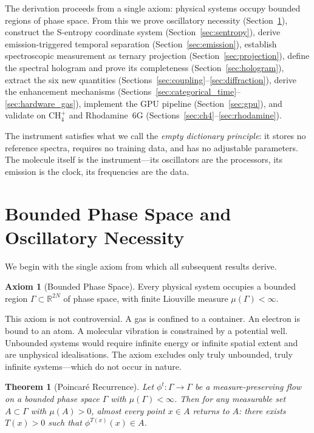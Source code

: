 \documentclass[11pt,twocolumn,a4paper]{article}
\newtheorem{theorem}{Theorem}[section]
\theoremstyle{definition}
\newtheorem{axiom}{Axiom}
\theoremstyle{remark}
\begin{document}
The derivation proceeds from a single axiom: physical systems occupy bounded regions of phase space. From this we prove oscillatory necessity (Section~\ref{sec:bounded}), construct the S-entropy coordinate system (Section~\ref{sec:sentropy}), derive emission-triggered temporal separation (Section~\ref{sec:emission}), establish spectroscopic measurement as ternary projection (Section~\ref{sec:projection}), define the spectral hologram and prove its completeness (Section~\ref{sec:hologram}), extract the six new quantities (Sections~\ref{sec:coupling}--\ref{sec:diffraction}), derive the enhancement mechanisms (Sections~\ref{sec:categorical_time}--\ref{sec:hardware_gas}), implement the GPU pipeline (Section~\ref{sec:gpu}), and validate on CH$_4^+$ and Rhodamine~6G (Sections~\ref{sec:ch4}--\ref{sec:rhodamine}).

The instrument satisfies what we call the \emph{empty dictionary principle}: it stores no reference spectra, requires no training data, and has no adjustable parameters. The molecule itself is the instrument---its oscillators are the processors, its emission is the clock, its frequencies are the data.

\section{Bounded Phase Space and Oscillatory Necessity}
\label{sec:bounded}

We begin with the single axiom from which all subsequent results derive.

\begin{axiom}[Bounded Phase Space]
\label{ax:bounded}
Every physical system occupies a bounded region $\Gamma \subset \mathbb{R}^{2N}$ of phase space, with finite Liouville measure $\mu(\Gamma) < \infty$.
\end{axiom}

This axiom is not controversial. A gas is confined to a container. An electron is bound to an atom. A molecular vibration is constrained by a potential well. Unbounded systems would require infinite energy or infinite spatial extent and are unphysical idealisations. The axiom excludes only truly unbounded, truly infinite systems---which do not occur in nature.

\begin{theorem}[Poincar{\'e} Recurrence]
\label{thm:poincare}
Let $\phi^t : \Gamma \to \Gamma$ be a measure-preserving flow on a bounded phase space $\Gamma$ with $\mu(\Gamma) < \infty$. Then for any measurable set $A \subset \Gamma$ with $\mu(A) > 0$, almost every point $x \in A$ returns to $A$: there exists $T(x) > 0$ such that $\phi^{T(x)}(x) \in A$.
\end{theorem}
\end{document}
